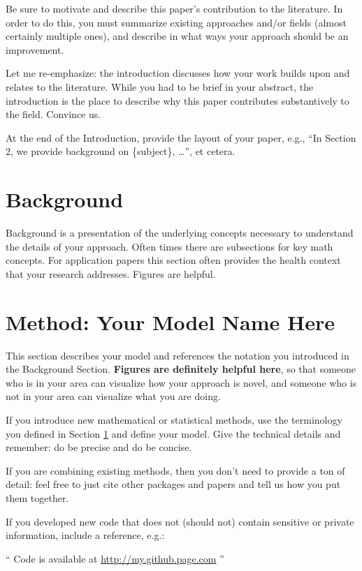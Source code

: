 \documentclass[twoside,11pt]{article}
\begin{document}
Be sure to motivate and describe this paper's contribution to the literature.
In order to do this, you must summarize existing approaches and/or fields (almost certainly multiple ones),
and describe in what ways your approach should be an improvement. 

Let me re-emphasize: the introduction discusses how your work builds upon and relates to the literature. While you had to be brief in your abstract, the introduction is the place to describe why this paper contributes substantively to the field. Convince us.

At the end of the Introduction, provide the layout of your paper, e.g., ``In Section 2, we provide background on \{subject\}, \dots'',  et cetera.

\section{Background} \label{background}
Background is a presentation of the underlying concepts necessary to understand the details of your approach. Often times there are subsections for key math concepts. For application papers this section often provides the health context that your research addresses. Figures are helpful.

\section{Method: Your Model Name Here} \label{model}
This section describes your model and references the notation you introduced in the Background Section. \textbf{Figures are definitely helpful here}, so that someone who is in your area can visualize how your approach is novel, and someone who is not in your area can visualize what you are doing.

If you introduce new mathematical or statistical methods, use the terminology you defined in Section \ref{background} and define your model. Give the technical details and remember: do be precise and do be concise.

If you are combining existing methods, then you don't need to provide a ton of detail: feel free to just cite other packages and papers and tell us how you put them together.  

If you developed new code that does not (should not) contain sensitive or private information, include a reference, e.g.:

`` Code is available at \url{http://my.github.page.com} ''
\end{document}
